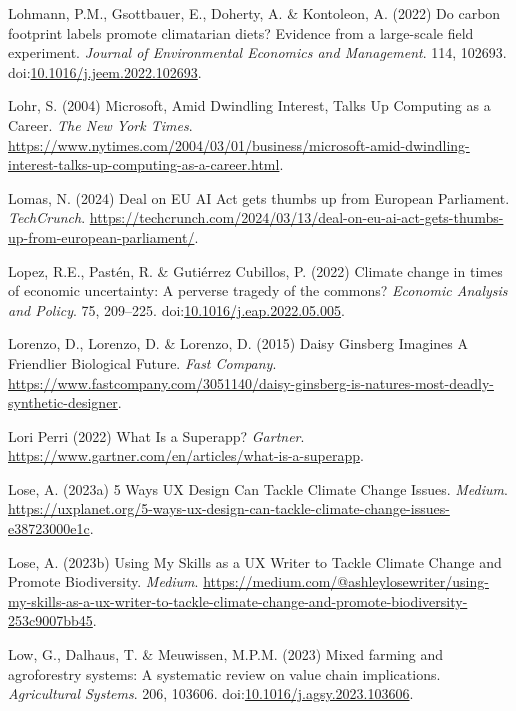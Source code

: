 \documentclass[
  letterpaper,
  DIV=11,
  numbers=noendperiod]{scrartcl}
\newlength{\cslhangindent}
\newenvironment{CSLReferences}[2] %
 {\begin{list}{}{%
  \setlength{\itemindent}{0pt}
  \setlength{\leftmargin}{0pt}
  \setlength{\parsep}{0pt}
  \ifodd #1
   \setlength{\leftmargin}{\cslhangindent}
   \setlength{\itemindent}{-1\cslhangindent}
  \fi
  \setlength{\itemsep}{#2\baselineskip}}}
 {\end{list}}
\begin{document}
\begin{CSLReferences}{0}{1}
Lohmann, P.M., Gsottbauer, E., Doherty, A. \& Kontoleon, A. (2022) Do
carbon footprint labels promote climatarian diets? {Evidence} from a
large-scale field experiment. \emph{Journal of Environmental Economics
and Management}. 114, 102693.
doi:\href{https://doi.org/10.1016/j.jeem.2022.102693}{10.1016/j.jeem.2022.102693}.

Lohr, S. (2004) Microsoft, {Amid Dwindling Interest}, {Talks Up
Computing} as a {Career}. \emph{The New York Times}.
\url{https://www.nytimes.com/2004/03/01/business/microsoft-amid-dwindling-interest-talks-up-computing-as-a-career.html}.

Lomas, N. (2024) Deal on {EU AI Act} gets thumbs up from {European
Parliament}. \emph{TechCrunch}.
\url{https://techcrunch.com/2024/03/13/deal-on-eu-ai-act-gets-thumbs-up-from-european-parliament/}.

Lopez, R.E., Pastén, R. \& Gutiérrez Cubillos, P. (2022) Climate change
in times of economic uncertainty: {A} perverse tragedy of the commons?
\emph{Economic Analysis and Policy}. 75, 209--225.
doi:\href{https://doi.org/10.1016/j.eap.2022.05.005}{10.1016/j.eap.2022.05.005}.

Lorenzo, D., Lorenzo, D. \& Lorenzo, D. (2015) Daisy {Ginsberg Imagines
A Friendlier Biological Future}. \emph{Fast Company}.
\url{https://www.fastcompany.com/3051140/daisy-ginsberg-is-natures-most-deadly-synthetic-designer}.

Lori Perri (2022) What {Is} a {Superapp}? \emph{Gartner}.
\url{https://www.gartner.com/en/articles/what-is-a-superapp}.

Lose, A. (2023a) 5 {Ways UX Design Can Tackle Climate Change Issues}.
\emph{Medium}.
\url{https://uxplanet.org/5-ways-ux-design-can-tackle-climate-change-issues-e38723000e1c}.

Lose, A. (2023b) Using {My Skills} as a {UX Writer} to {Tackle Climate
Change} and {Promote Biodiversity}. \emph{Medium}.
\url{https://medium.com/@ashleylosewriter/using-my-skills-as-a-ux-writer-to-tackle-climate-change-and-promote-biodiversity-253c9007bb45}.

Low, G., Dalhaus, T. \& Meuwissen, M.P.M. (2023) Mixed farming and
agroforestry systems: {A} systematic review on value chain implications.
\emph{Agricultural Systems}. 206, 103606.
doi:\href{https://doi.org/10.1016/j.agsy.2023.103606}{10.1016/j.agsy.2023.103606}.


\end{CSLReferences}
\end{document}
